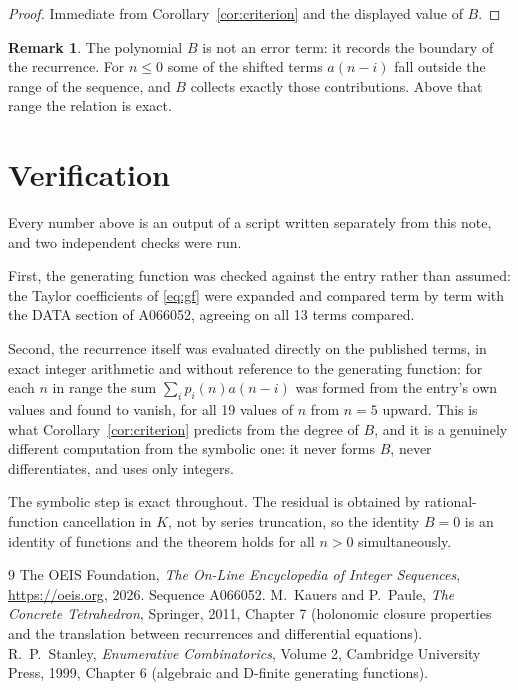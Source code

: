 \documentclass[11pt,a4paper]{article}
\theoremstyle{plain}
\theoremstyle{definition}
\newtheorem{remark}[theorem]{Remark}
\begin{document}
\begin{proof}
Immediate from Corollary~\ref{cor:criterion} and the displayed value of $B$.
\end{proof}

\begin{remark}
The polynomial $B$ is not an error term: it records the boundary of the recurrence. For
$n\le0$ some of the shifted terms $a(n-i)$ fall outside the range of the sequence,
and $B$ collects exactly those contributions. Above that range the relation is exact.
\end{remark}

\section{Verification}

Every number above is an output of a script written separately from this note, and two
independent checks were run.

First, the generating function was checked against the entry rather than assumed: the
Taylor coefficients of \eqref{eq:gf} were expanded and compared term by term with the DATA
section of A066052, agreeing on all 13 terms compared.

Second, the recurrence itself was evaluated directly on the published terms, in exact
integer arithmetic and without reference to the generating function: for each $n$ in range
the sum $\sum_{i}p_{i}(n)a(n-i)$ was formed from the entry's own values and found to
vanish, for all 19 values of $n$ from $n=5$ upward. This is what
Corollary~\ref{cor:criterion} predicts from the degree of $B$, and it is a genuinely
different computation from the symbolic one: it never forms $B$, never differentiates, and
uses only integers.

The symbolic step is exact throughout. The residual is obtained by rational-function
cancellation in $K$, not by series truncation, so the identity $B=0$ is an
identity of functions and the theorem holds for all $n>0$ simultaneously.

\begin{thebibliography}{9}
 The OEIS Foundation, \emph{The On-Line Encyclopedia of Integer Sequences},
\url{https://oeis.org}, 2026. Sequence A066052.
 M.~Kauers and P.~Paule, \emph{The Concrete Tetrahedron}, Springer, 2011,
Chapter 7 (holonomic closure properties and the translation between recurrences and
differential equations).
 R.~P.~Stanley, \emph{Enumerative Combinatorics}, Volume 2, Cambridge
University Press, 1999, Chapter 6 (algebraic and D-finite generating functions).
\end{thebibliography}
\end{document}
